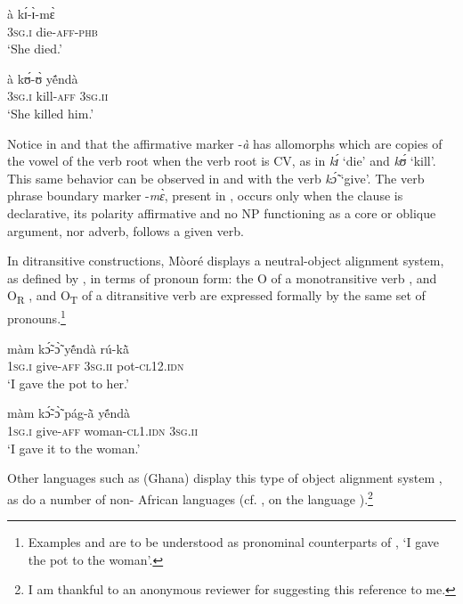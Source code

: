 \documentclass[output=paper]{langsci/langscibook}
\begin{document}
\ea
\label{ex:10.pacchiarotti}
\gll à    kɪ́-ɪ̀-mɛ̀      \\     
\textsc{3sg.i} die-\textsc{aff-phb} \\
\glt`She died.'
\z 

\ea
\label{ex:11.pacchiarotti}
\gll à    kʊ́-ʊ̀    yẽ́ndà\\
\textsc{3sg.i}    kill-\textsc{aff}  \textsc{3sg.ii}\\
\glt`She killed him.'
\z

Notice in  and  that the affirmative marker -\textit{à} has allomorphs which are copies of the vowel of the verb root when the verb root is CV, as in \textit{kɪ́} `die' and \textit{kʊ́} `kill'. This same behavior can be observed in  and  with the verb \textit{k\'{\~{ɔ}}} `give'. The verb phrase boundary marker -\textit{mɛ̀}, present in , occurs only when the clause is declarative, its polarity affirmative and no NP functioning as a core or oblique argument, nor adverb, follows a given verb.  

In ditransitive constructions, Mòoré displays a neutral-object alignment system, as defined by \citet{malchukovetal2010}, in terms of pronoun form: the O of a monotransitive verb , and O\textsubscript{R} , and O\textsubscript{T}  of a ditransitive verb are expressed formally by the same set of pronouns.\footnote{Examples  and  are to be understood as pronominal counterparts of , `I gave the pot to the woman'.} 

\ea
\label{ex:12.pacchiarotti}
\gll màm    kɔ̃́-ɔ̃̀      y\'{ẽ}ndà    rú-k\`{ã}\\
\textsc{1sg.i}    give-\textsc{aff}    \textsc{3sg.ii}    pot\textsc{-cl12.idn} \\
\glt `I gave the pot to her.'
\z

\ea
\label{ex:13.pacchiarotti}
\gll màm    kɔ̃́-ɔ̃̀    pág-\`{ã}      y\'{ẽ}ndà\\
\textsc{1sg.i}    give-\textsc{aff}  woman-\textsc{cl1.idn}  \textsc{3sg.ii} \\
\glt `I gave it to the woman.'
\z

Other  languages such as  (Ghana) display this type of object alignment system \citep{bodomo1997}, as do a number of non- African languages (cf. \citealt{ackermanetaltoappear}, on the  language ).\footnote{I am thankful to an anonymous reviewer for suggesting this reference to me.}
\end{document}
